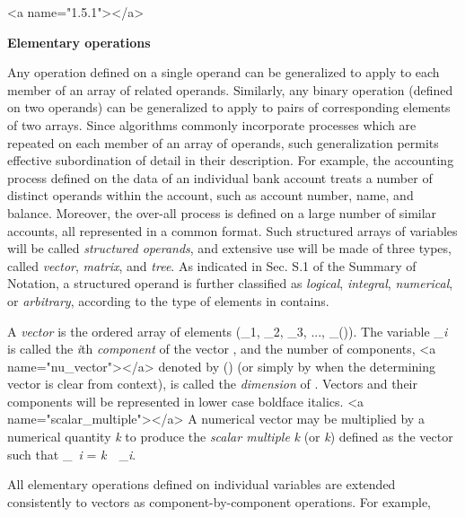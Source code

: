 <a name="1.5.1"></a>
\par \textbf{Elementary operations}

\par Any operation defined on a single operand can be generalized to apply to each member of an array of related operands. Similarly, any binary operation (defined on two operands) can be generalized to apply to pairs of corresponding elements of two arrays. Since algorithms commonly incorporate processes which are repeated on each member of an array of operands, such generalization permits effective subordination of detail in their description. For example, the accounting process defined on the data of an individual bank account treats a number of distinct operands within the account, such as account number, name, and balance. Moreover, the over-all process is defined on a large number of similar accounts, all represented in a common format. Such structured arrays of variables will be called \textit{structured operands}, and extensive use will be made of three types, called \textit{vector}, \textit{matrix}, and \textit{tree}. As indicated in Sec. S.1 of the Summary of Notation, a structured operand is further classified as \textit{logical}, \textit{integral},
\textit{numerical}, or \textit{arbitrary}, according to the type of elements in contains.

\par A \textit{vector}  is the ordered array of elements (_{1},
_{2},
_{3}, ...,
_{\textit{\nu}()}). The variable _{\textit{i}} is called the \textit{i}th \textit{component} of the vector , and the number of components,
<a name="nu_vector"></a> denoted by \textit{\nu}() (or simply by \textit{\nu} when the determining vector is clear from context), is called the \textit{dimension} of . Vectors and their components will be represented in lower case boldface italics.
<a name="scalar_multiple"></a> A numerical vector  may be multiplied by a numerical quantity \textit{k} to produce the
\textit{scalar multiple} 
\textit{k} \times {} (or \textit{k}) defined as the vector  such that 
_{\textit{\ i}} = 
\textit{k}\ \times\ _{\textit{i}}.

\par All elementary operations defined on individual variables are extended consistently to vectors as component-by-component operations. For example,

